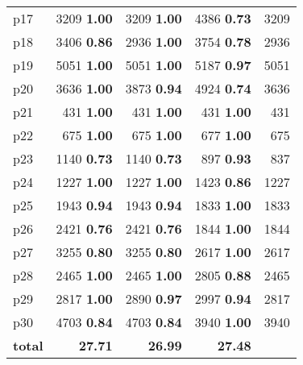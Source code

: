 \begin{tabular}{|l|rrr|r|}
p17 & {\footnotesize 3209} \textbf{1.00} & {\footnotesize 3209} \textbf{1.00} & {\footnotesize 4386} \textbf{0.73} & 3209\\
p18 & {\footnotesize 3406} \textbf{0.86} & {\footnotesize 2936} \textbf{1.00} & {\footnotesize 3754} \textbf{0.78} & 2936\\
p19 & {\footnotesize 5051} \textbf{1.00} & {\footnotesize 5051} \textbf{1.00} & {\footnotesize 5187} \textbf{0.97} & 5051\\
p20 & {\footnotesize 3636} \textbf{1.00} & {\footnotesize 3873} \textbf{0.94} & {\footnotesize 4924} \textbf{0.74} & 3636\\
p21 & {\footnotesize 431} \textbf{1.00} & {\footnotesize 431} \textbf{1.00} & {\footnotesize 431} \textbf{1.00} & 431\\
p22 & {\footnotesize 675} \textbf{1.00} & {\footnotesize 675} \textbf{1.00} & {\footnotesize 677} \textbf{1.00} & 675\\
p23 & {\footnotesize 1140} \textbf{0.73} & {\footnotesize 1140} \textbf{0.73} & {\footnotesize 897} \textbf{0.93} & 837\\
p24 & {\footnotesize 1227} \textbf{1.00} & {\footnotesize 1227} \textbf{1.00} & {\footnotesize 1423} \textbf{0.86} & 1227\\
p25 & {\footnotesize 1943} \textbf{0.94} & {\footnotesize 1943} \textbf{0.94} & {\footnotesize 1833} \textbf{1.00} & 1833\\
p26 & {\footnotesize 2421} \textbf{0.76} & {\footnotesize 2421} \textbf{0.76} & {\footnotesize 1844} \textbf{1.00} & 1844\\
p27 & {\footnotesize 3255} \textbf{0.80} & {\footnotesize 3255} \textbf{0.80} & {\footnotesize 2617} \textbf{1.00} & 2617\\
p28 & {\footnotesize 2465} \textbf{1.00} & {\footnotesize 2465} \textbf{1.00} & {\footnotesize 2805} \textbf{0.88} & 2465\\
p29 & {\footnotesize 2817} \textbf{1.00} & {\footnotesize 2890} \textbf{0.97} & {\footnotesize 2997} \textbf{0.94} & 2817\\
p30 & {\footnotesize 4703} \textbf{0.84} & {\footnotesize 4703} \textbf{0.84} & {\footnotesize 3940} \textbf{1.00} & 3940\\
\hline
\textbf{total} & \textbf{27.71} & \textbf{26.99} & \textbf{27.48} & \\
\hline
\end{tabular}

